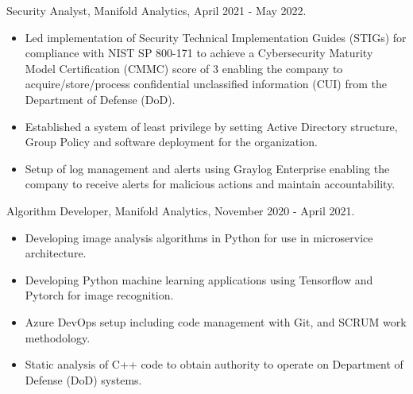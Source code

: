 \documentclass[12pt,a4paper]{article}
\begin{document}
Security Analyst, Manifold Analytics, April 2021 - May 2022.
\begin{itemize}
     \item Led implementation of Security Technical Implementation Guides (STIGs) for compliance with NIST SP 800-171 to achieve a Cybersecurity Maturity Model Certification (CMMC) score of 3 enabling the company to acquire/store/process confidential unclassified information (CUI) from the Department of Defense (DoD).
     \item Established a system of least privilege by setting Active Directory structure, Group Policy and software deployment for the organization.
     \item Setup of log management and alerts using Graylog Enterprise enabling the company to receive alerts for malicious actions and maintain accountability.
\end{itemize}

Algorithm Developer, Manifold Analytics, November 2020 - April 2021.
\begin{itemize}
    \item Developing image analysis algorithms in Python for use in microservice architecture.
    \item Developing Python machine learning applications using Tensorflow and Pytorch for image recognition.
    \item Azure DevOps setup including code management with Git, and SCRUM work methodology.
    \item Static analysis of C++ code to obtain authority to operate on Department of Defense (DoD) systems.
\end{itemize}
    
    
\end{document}
